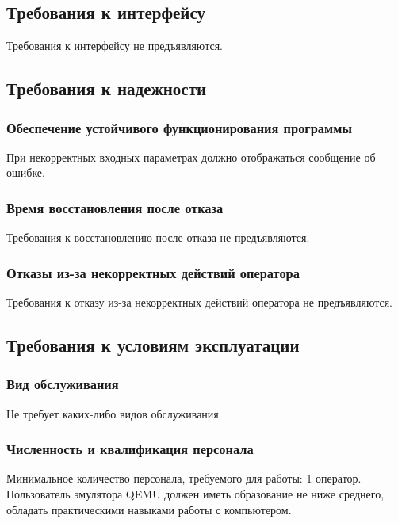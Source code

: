 \subsection{Требования к интерфейсу}
Требования к интерфейсу не предъявляются.

\subsection{Требования к надежности}
\subsubsection{Обеспечение устойчивого функционирования программы}
При некорректных входных параметрах должно отображаться сообщение об ошибке.
\subsubsection{Время восстановления после отказа}
Требования к восстановлению после отказа не предъявляются.
\subsubsection{Отказы из-за некорректных действий оператора}
Требования к отказу из-за некорректных действий оператора не предъявляются.

\subsection{Требования к условиям эксплуатации}
\subsubsection{Вид обслуживания}
Не требует каких-либо видов обслуживания.
\subsubsection{Численность и квалификация персонала}
Минимальное количество персонала, требуемого для работы: 1 оператор. Пользователь эмулятора QEMU должен иметь образование не ниже среднего, обладать практическими навыками работы с компьютером.

